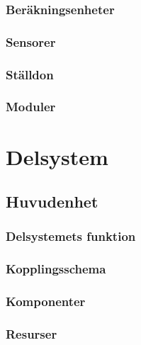 \documentclass{article}
\begin{document}
\subsubsection{Beräkningsenheter}

\subsubsection{Sensorer}

\subsubsection{Ställdon}

\subsubsection{Moduler}

\clearpage

\section{Delsystem}

\subsection{Huvudenhet}

\subsubsection{Delsystemets funktion}

\subsubsection{Kopplingsschema}

\subsubsection{Komponenter}

\subsubsection{Resurser}
\end{document}
